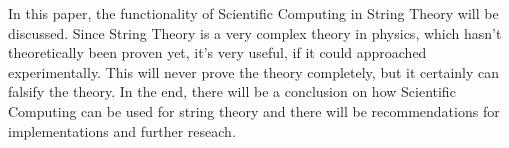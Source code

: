 \documentclass[../paper.tex]{subfiles}
\begin{document}
In this paper, the functionality of Scientific Computing in String Theory will be discussed. Since String Theory is a very complex theory in physics, which hasn't theoretically been proven yet, it's very useful, if it could approached experimentally. This will never prove the theory completely, but it certainly can falsify the theory. In the end, there will be a conclusion on how Scientific Computing can be used for string theory and there will be recommendations for implementations and further reseach.
\end{document}
